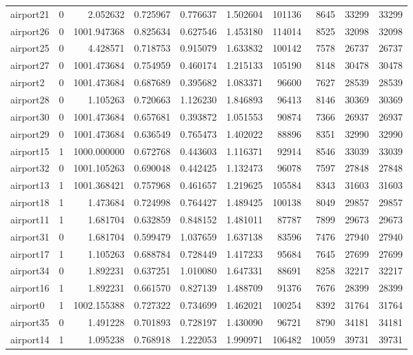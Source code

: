 \documentclass[../../../thesis.tex]{subfiles}
\begin{document}
\begin{longtable}{|l|r|r|r|r|r|r|r|r|r|}
airport21 & 0 & 2.052632 & 0.725967 & 0.776637 & 1.502604 & 101136 & 8645 & 33299 & 33299 \\
airport26 & 0 & 1001.947368 & 0.825634 & 0.627546 & 1.453180 & 114014 & 8525 & 32098 & 32098 \\
airport25 & 0 & 4.428571 & 0.718753 & 0.915079 & 1.633832 & 100142 & 7578 & 26737 & 26737 \\
airport27 & 0 & 1001.473684 & 0.754959 & 0.460174 & 1.215133 & 105190 & 8148 & 30478 & 30478 \\
airport2 & 0 & 1001.473684 & 0.687689 & 0.395682 & 1.083371 & 96600 & 7627 & 28539 & 28539 \\
airport28 & 0 & 1.105263 & 0.720663 & 1.126230 & 1.846893 & 96413 & 8146 & 30369 & 30369 \\
airport30 & 0 & 1001.473684 & 0.657681 & 0.393872 & 1.051553 & 90874 & 7366 & 26937 & 26937 \\
airport29 & 0 & 1001.473684 & 0.636549 & 0.765473 & 1.402022 & 88896 & 8351 & 32990 & 32990 \\
airport15 & 1 & 1000.000000 & 0.672768 & 0.443603 & 1.116371 & 92914 & 8546 & 33039 & 33039 \\
airport32 & 0 & 1001.105263 & 0.690048 & 0.442425 & 1.132473 & 96078 & 7597 & 27848 & 27848 \\
airport13 & 1 & 1001.368421 & 0.757968 & 0.461657 & 1.219625 & 105584 & 8343 & 31603 & 31603 \\
airport18 & 1 & 1.473684 & 0.724998 & 0.764427 & 1.489425 & 100138 & 8049 & 29857 & 29857 \\
airport11 & 1 & 1.681704 & 0.632859 & 0.848152 & 1.481011 & 87787 & 7899 & 29673 & 29673 \\
airport31 & 0 & 1.681704 & 0.599479 & 1.037659 & 1.637138 & 83596 & 7476 & 27940 & 27940 \\
airport17 & 1 & 1.105263 & 0.688784 & 0.728449 & 1.417233 & 95684 & 7645 & 27699 & 27699 \\
airport34 & 0 & 1.892231 & 0.637251 & 1.010080 & 1.647331 & 88691 & 8258 & 32217 & 32217 \\
airport16 & 1 & 1.892231 & 0.661570 & 0.827139 & 1.488709 & 91376 & 7676 & 28399 & 28399 \\
airport0 & 1 & 1002.155388 & 0.727322 & 0.734699 & 1.462021 & 100254 & 8392 & 31764 & 31764 \\
airport35 & 0 & 1.491228 & 0.701893 & 0.728197 & 1.430090 & 96721 & 8790 & 34181 & 34181 \\
airport14 & 1 & 1.095238 & 0.768918 & 1.222053 & 1.990971 & 106482 & 10059 & 39731 & 39731 \\

\end{longtable}
\end{document}
